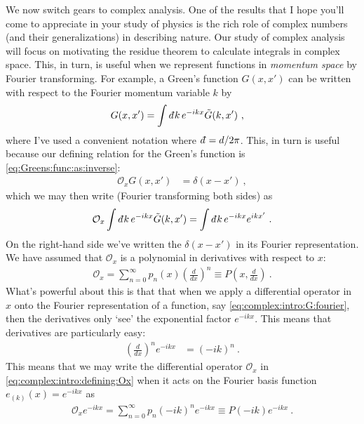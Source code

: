 \documentclass[
  11pt,
	colorful,
	raggedright,
]{tufte-style-thesis-flip}
\renewcommand{\dbar}{d\mkern-6mu\mathchar'26\hspace{-.1em}}    %
\begin{document}
We now switch gears to complex analysis. One of the results that I hope you'll come to appreciate in your study of physics is the rich role of complex numbers (and their generalizations) in describing nature. Our study of complex analysis will focus on motivating the residue theorem to calculate integrals in complex space. This, in turn, is useful when we represent functions in \emph{momentum space} by Fourier transforming. For example, a Green's function $G(x,x')$ can be written with respect to the Fourier momentum variable $k$ by
\begin{align}
  G(x,x') &= \int \dbar k \, e^{-ikx} \tilde G(k,x') \ ,
  \label{eq:complex:intro:G:fourier}
\end{align}
where I've used a convenient notation where $\dbar = d/2\pi$. This, in turn is useful because our defining relation for the Green's function is \eqref{eq:Greens:func:as:inverse}:
\begin{align}
  \mathcal O_xG(x,x') &= \delta(x-x') \ ,
\end{align}
which we may then write (Fourier transforming both sides) as
\begin{align}
  \mathcal O_x \int \dbar k \, e^{-ikx} \tilde G(k,x') 
  =
  \int \dbar k \, e^{-ikx} e^{ikx'} \ .
  \label{eq:complex:intro:defining:G:}
\end{align}
On the right-hand side we've written the $\delta(x-x')$ in its Fourier representation. We have assumed that $\mathcal O_x$ is a polynomial in derivatives with respect to $x$:
\begin{align}
  \mathcal O_x = \sum_{n=0}^{\infty}
  p_n(x) \left(\frac{d}{dx}\right)^n
  \equiv P\left(x,\frac{d}{dx}\right) \ .
  \label{eq:complex:intro:defining:Ox}
\end{align}
What's powerful about this is that that when we apply a differential operator in $x$ onto the Fourier representation of a function, say \eqref{eq:complex:intro:G:fourier}, then the derivatives only `see' the exponential factor $e^{-ikx}$. This means that derivatives are particularly easy:
\begin{align}
  \left(\frac{d}{dx}\right)^n e^{-ikx} &= (-ik)^n \ .
\end{align}
This means that we may write the differential operator $\mathcal O_x$ in \eqref{eq:complex:intro:defining:Ox} when it acts on the Fourier basis function $e_{(k)}(x) = e^{-ikx}$ as
\begin{align}
  \mathcal O_x e^{-ikx} = \sum_{n=0}^{\infty}
  p_n \left(-ik\right)^n e^{-ikx}
  \equiv P(-ik) e^{-ikx}  \ .
\end{align}
\end{document}
